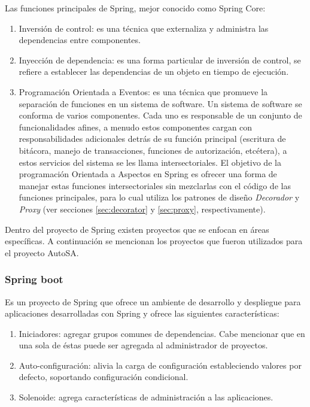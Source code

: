 Las funciones principales de Spring, mejor conocido como Spring Core\cite{Spring5DesignPatterns, ProSpring5, WellGroundedJavaDeveloper, SpringInAction}:
\begin{enumerate}
	\item Inversión de control: es una técnica que externaliza y administra las dependencias entre componentes.

	\item Inyección de dependencia: es una forma particular de inversión de control, se refiere a establecer las dependencias de un objeto en tiempo de ejecución.

	\item Programación Orientada a Eventos: es una técnica que promueve la separación de funciones en un sistema de software. Un sistema de software se conforma de varios componentes. Cada uno es responsable de un conjunto de funcionalidades afines, a menudo estos componentes cargan con responsabilidades adicionales detrás de su función principal (escritura de bitácora, manejo de transacciones, funciones de autorización, etcétera), a estos servicios del sistema se les llama intersectoriales. El objetivo de la programación Orientada a Aspectos en Spring  es ofrecer una forma de manejar estas funciones intersectoriales sin mezclarlas con el código de las funciones principales, para lo cual utiliza los patrones de diseño \textit{Decorador} y \textit{Proxy} (ver secciones \ref{sec:decorator} y \ref{sec:proxy}, respectivamente).
\end{enumerate}

Dentro del proyecto de Spring existen proyectos que se enfocan en áreas específicas. A continuación se mencionan los proyectos que fueron utilizados para el proyecto AutoSA.

\subsubsection{Spring boot}\label{sec:spring-boot}
Es un proyecto de Spring que ofrece un ambiente de desarrollo y despliegue para aplicaciones desarrolladas con Spring y ofrece las siguientes características\cite{SpringBootInAction}:
\begin{enumerate}
	\item Iniciadores: agregar grupos comunes de dependencias. Cabe mencionar que en una sola de éstas puede ser agregada al administrador de proyectos.
	\item Auto-configuración: alivia la carga de configuración estableciendo valores por defecto, soportando configuración condicional.
	\item Solenoide: agrega características de administración a las aplicaciones.
\end{enumerate}

